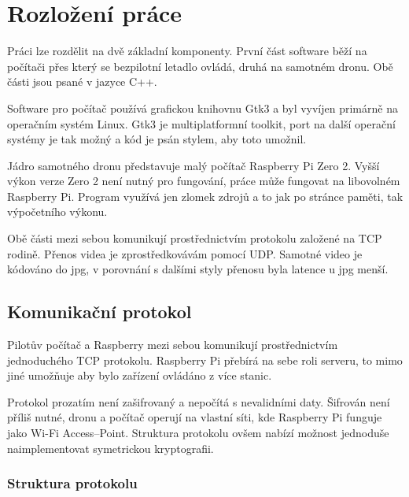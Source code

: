 \documentclass[a4paper,oneside,12pt]{report}
\begin{document}


\tableofcontents


\newpage



\setcounter{page}{1}

\chapter{Rozložení práce}

Práci lze rozdělit na dvě základní komponenty.
První část software běží na počítači přes který se bezpilotní letadlo ovládá, druhá na samotném dronu.
Obě části jsou psané v jazyce C++.

Software pro počítač používá grafickou knihovnu Gtk3 a byl vyvíjen primárně na operačním systém Linux.
Gtk3 je multiplatformní toolkit, port na další operační systémy je tak možný a kód je psán stylem, aby toto umožnil.

Jádro samotného dronu představuje malý počítač Raspberry Pi Zero 2.
Vyšší výkon verze Zero 2 není nutný pro fungování, práce může fungovat na libovolném Raspberry Pi.
Program využívá jen zlomek zdrojů  a to jak po stránce paměti, tak výpočetního výkonu.

Obě části mezi sebou komunikují prostřednictvím protokolu založené na TCP rodině.
Přenos videa je zprostředkovávám pomocí UDP.
Samotné video je kódováno do jpg, v porovnání s dalšími styly přenosu byla latence u jpg menší.

\section{Komunikační protokol}

Pilotův počítač a Raspberry mezi sebou komunikují prostřednictvím jednoduchého TCP protokolu.
Raspberry Pi přebírá na sebe roli serveru, to mimo jiné umožňuje aby bylo zařízení ovládáno z více stanic.

Protokol prozatím není zašifrovaný a nepočítá s nevalidními daty.
Šifrován není příliš nutné, dronu a počítač operují na vlastní síti, kde Raspberry Pi funguje jako Wi-Fi Access--Point.
Struktura protokolu ovšem nabízí možnost jednoduše naimplementovat symetrickou kryptografii.

\subsection{Struktura protokolu}
\end{document}
